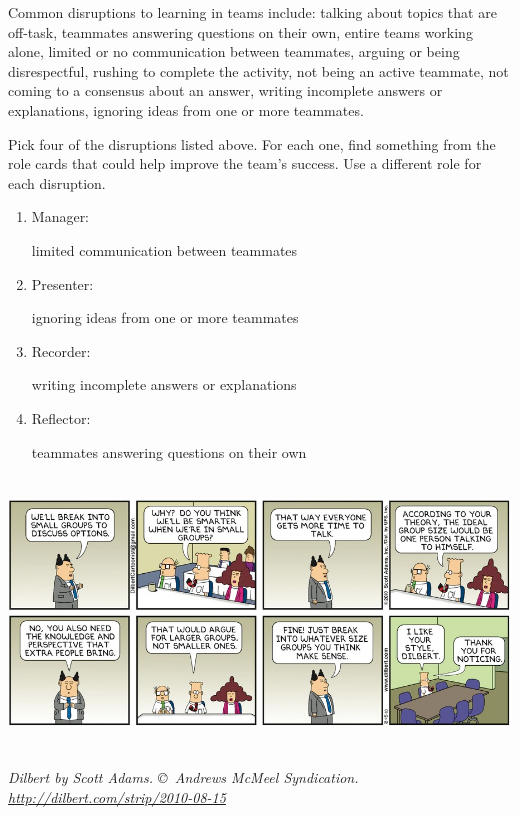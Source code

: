 
Common disruptions to learning in teams include:
  talking about topics that are off-task,
  teammates answering questions on their own,
  entire teams working alone,
  limited or no communication between teammates,
  arguing or being disrespectful,
  rushing to complete the activity,
  not being an active teammate,
  not coming to a consensus about an answer,
  writing incomplete answers or explanations,
  ignoring ideas from one or more teammates.




\Q Pick four of the disruptions listed above.
For each one, find something from the role cards that could help improve the team's success.
Use a different role for each disruption.

\begin{enumerate}[itemsep=1ex]

\item Manager:

\begin{answer}[2em]
limited communication between teammates
\end{answer}

\item Presenter:

\begin{answer}[2em]
ignoring ideas from one or more teammates
\end{answer}

\item Recorder:

\begin{answer}[2em]
writing incomplete answers or explanations
\end{answer}

\item Reflector:

\begin{answer}[2em]
teammates answering questions on their own
\end{answer}

\end{enumerate}

\begin{center}
\includegraphics[height=2.85in]{disrupt1.png}
\par \itshape \footnotesize
Dilbert by Scott Adams.
\copyright\ Andrews McMeel Syndication.
\url{http://dilbert.com/strip/2010-08-15}
\end{center}
